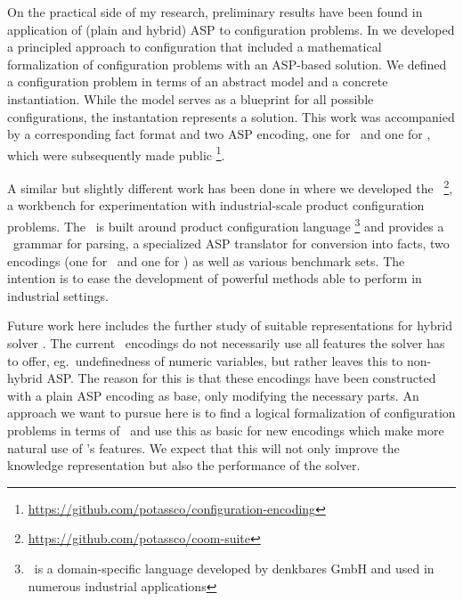 On the practical side of my research, preliminary results have been found in application of (plain and hybrid) ASP to configuration problems.
%
In \cite{ruscst23a} we developed a principled approach to configuration that included a mathematical formalization
of configuration problems with an ASP-based solution.
%
We defined a configuration problem in terms of an abstract model and a concrete instantiation.
While the model serves as a blueprint for all possible configurations, the instantation represents a solution.
%
This work was accompanied by a corresponding fact format and two ASP encoding, one for \clingo\ and one for \fclingo,
which were subsequently made public \footnote{\url{https://github.com/potassco/configuration-encoding}}.

A similar but slightly different work has been done in \cite{baheosreruscwa24a} where we developed the \coomsuite\ \footnote{\url{https://github.com/potassco/coom-suite}},
a workbench for experimentation with industrial-scale product configuration problems.
%
The \coomsuite\ is built around product configuration language \coom \cite{coomlang}
\footnote{\Coom\ is a domain-specific language developed by denkbares GmbH and used in numerous industrial applications}
and provides a \coom\ grammar for parsing, a specialized ASP translator for conversion into facts, two encodings (one for \clingo\ and one for \fclingo)
as well as various benchmark sets.
%
The intention is to ease the development of powerful methods able to perform in industrial settings.

Future work here includes the further study of suitable representations for hybrid solver \fclingo.
%
The current \fclingo\ encodings do not necessarily use all features the solver has to offer, eg.\ undefinedness of numeric variables,
but rather leaves this to non-hybrid ASP.
%
The reason for this is that these encodings have been constructed with a plain ASP encoding as base,
only modifying the necessary parts.
%
An approach we want to pursue here is to find a logical formalization of configuration problems in terms of \HTC\
and use this as basic for new encodings which make more natural use of \fclingo's features.
%
We expect that this will not only improve the knowledge representation but also the performance of the solver.
